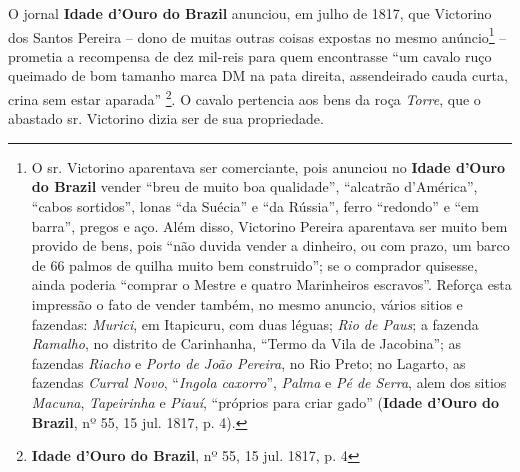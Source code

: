 O jornal \textbf{Idade d'Ouro do Brazil} anunciou, em julho de 1817, que Victorino dos Santos Pereira -- dono de muitas outras coisas expostas no mesmo anúncio\footnote{O sr. Victorino aparentava ser comerciante, pois anunciou no \textbf{Idade d'Ouro do Brazil} vender ``breu de muito boa qualidade'', ``alcatrão d'América'', ``cabos sortidos'', lonas ``da Suécia'' e ``da Rússia'', ferro ``redondo'' e ``em barra'', pregos e aço. Além disso, Victorino Pereira aparentava ser muito bem provido de bens, pois ``não duvida vender a dinheiro, ou com prazo, um barco de 66 palmos de quilha muito bem construido''; se o comprador quisesse, ainda poderia ``comprar o Mestre e quatro Marinheiros escravos''. Reforça esta impressão o fato de vender também, no mesmo anuncio, vários sitios e fazendas: \textit{Murici}, em Itapicuru, com duas léguas; \textit{Rio de Paus}; a fazenda \textit{Ramalho}, no distrito de Carinhanha, ``Termo da Vila de Jacobina''; as fazendas \textit{Riacho} e \textit{Porto de João Pereira}, no Rio Preto; no Lagarto, as fazendas \textit{Curral Novo}, ``\textit{Ingola caxorro}'', \textit{Palma} e \textit{Pé de Serra}, alem dos sitios \textit{Macuna}, \textit{Tapeirinha} e \textit{Piauí}, ``próprios para criar gado'' (\textbf{Idade d'Ouro do Brazil}, nº 55, 15 jul. 1817, p. 4).} -- prometia a recompensa de dez mil-reis para quem encontrasse ``um cavalo ruço queimado de bom tamanho marca DM na pata direita, assendeirado cauda curta, crina sem estar aparada'' \footnote{\textbf{Idade d'Ouro do Brazil}, nº 55, 15 jul. 1817, p. 4}. O cavalo pertencia aos bens da roça \textit{Torre}, que o abastado sr. Victorino dizia ser de sua propriedade.


